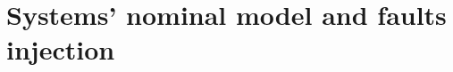 \documentclass[12pt,openright,twoside,a4paper,oldfontcommands,english,brazil,final]{abntex2}
\theoremstyle{theo}
\newcommand{\includegraphicsaspectratio}[2][1]{%
  \texttt{[image: \#2]}%
}
\newcommand{\parsin}[1]{\ensuremath\left( #1 \right)}
\begin{document}





\section{Systems' nominal model and faults injection}
\label{sec:faults-injection}
\end{document}
